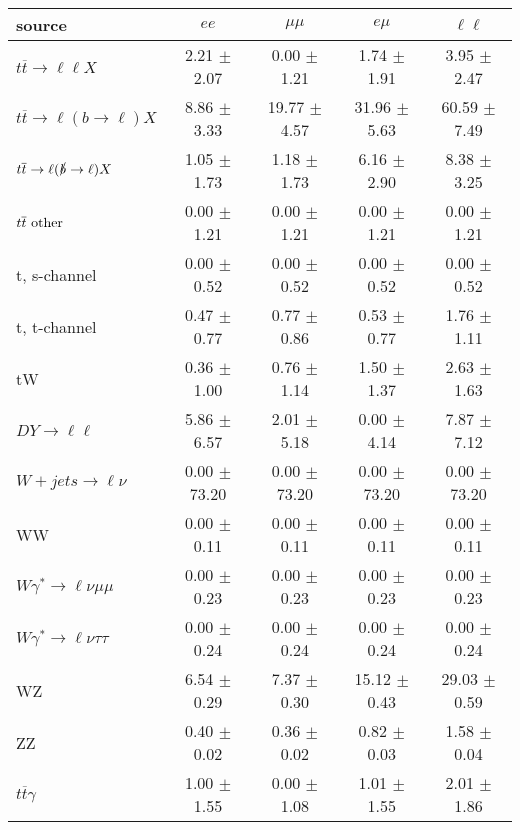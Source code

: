 \begin{tabular}{l|cccc} \hline\hline
source & $ee$ & $\mu\mu$ & $e\mu$ & $\ell\ell $ \\
\hline
$t\overline{t} \rightarrow \ell \ell X$ &  2.21 $\pm$  2.07 &  0.00 $\pm$  1.21 &  1.74 $\pm$  1.91 &  3.95 $\pm$  2.47 \\
$t\overline{t} \rightarrow \ell (b \rightarrow \ell) X$ &  8.86 $\pm$  3.33 & 19.77 $\pm$  4.57 & 31.96 $\pm$  5.63 & 60.59 $\pm$  7.49 \\
$t\overline{t} \rightarrow \ell (\slashed b \rightarrow \ell) X$ &  1.05 $\pm$  1.73 &  1.18 $\pm$  1.73 &  6.16 $\pm$  2.90 &  8.38 $\pm$  3.25 \\
        $t\overline{t}\ \rm{other}$ &  0.00 $\pm$  1.21 &  0.00 $\pm$  1.21 &  0.00 $\pm$  1.21 &  0.00 $\pm$  1.21 \\
\hline
                       t, s-channel &  0.00 $\pm$  0.52 &  0.00 $\pm$  0.52 &  0.00 $\pm$  0.52 &  0.00 $\pm$  0.52 \\
                       t, t-channel &  0.47 $\pm$  0.77 &  0.77 $\pm$  0.86 &  0.53 $\pm$  0.77 &  1.76 $\pm$  1.11 \\
                                 tW &  0.36 $\pm$  1.00 &  0.76 $\pm$  1.14 &  1.50 $\pm$  1.37 &  2.63 $\pm$  1.63 \\
\hline
         $DY \rightarrow \ell \ell$ &  5.86 $\pm$  6.57 &  2.01 $\pm$  5.18 &  0.00 $\pm$  4.14 &  7.87 $\pm$  7.12 \\
      $W+jets \rightarrow \ell \nu$ &  0.00 $\pm$ 73.20 &  0.00 $\pm$ 73.20 &  0.00 $\pm$ 73.20 &  0.00 $\pm$ 73.20 \\
                                 WW &  0.00 $\pm$  0.11 &  0.00 $\pm$  0.11 &  0.00 $\pm$  0.11 &  0.00 $\pm$  0.11 \\
\hline
$W\gamma^{*} \rightarrow \ell \nu \mu\mu$ &  0.00 $\pm$  0.23 &  0.00 $\pm$  0.23 &  0.00 $\pm$  0.23 &  0.00 $\pm$  0.23 \\
$W\gamma^{*} \rightarrow \ell \nu \tau\tau$ &  0.00 $\pm$  0.24 &  0.00 $\pm$  0.24 &  0.00 $\pm$  0.24 &  0.00 $\pm$  0.24 \\
                                 WZ &  6.54 $\pm$  0.29 &  7.37 $\pm$  0.30 & 15.12 $\pm$  0.43 & 29.03 $\pm$  0.59 \\
                                 ZZ &  0.40 $\pm$  0.02 &  0.36 $\pm$  0.02 &  0.82 $\pm$  0.03 &  1.58 $\pm$  0.04 \\
\hline
              $t\overline{t}\gamma$ &  1.00 $\pm$  1.55 &  0.00 $\pm$  1.08 &  1.01 $\pm$  1.55 &  2.01 $\pm$  1.86 \\

\end{tabular}
